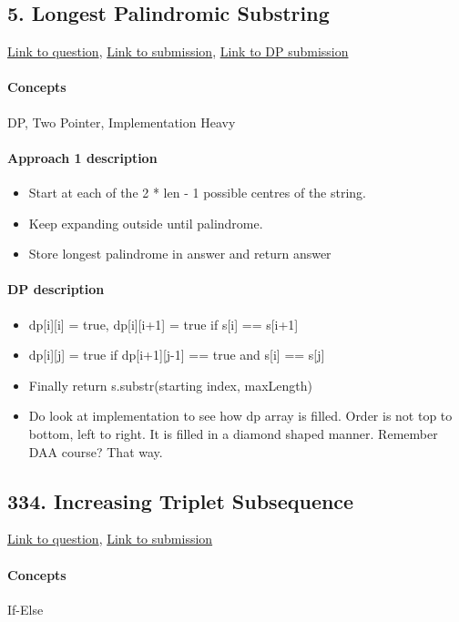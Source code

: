 \documentclass[11pt]{book}
\begin{document}
\subsection{5. Longest Palindromic Substring}
\href{https://leetcode.com/problems/longest-palindromic-substring/}{Link to question},
\href{https://leetcode.com/submissions/detail/337683777/}{Link to submission},
\href{https://leetcode.com/submissions/detail/337711978/}{Link to DP submission}
\paragraph{Concepts}
DP, Two Pointer, Implementation Heavy
\paragraph{Approach 1 description}
\begin{itemize}
    \item Start at each of the 2 * len - 1 possible centres of the string.
    \item Keep expanding outside until palindrome.
    \item Store longest palindrome in answer and return answer
\end{itemize}
\paragraph{DP description}
\begin{itemize}
    \item dp[i][i] = true, dp[i][i+1] = true if s[i] == s[i+1]
    \item dp[i][j] = true if dp[i+1][j-1] == true and s[i] == s[j]
    \item Finally return s.substr(starting index, maxLength)
    \item Do look at implementation to see how dp array is filled. Order is not top to bottom, left to right. It is filled in a diamond shaped manner. Remember DAA course? That way.
\end{itemize}

\subsection{334. Increasing Triplet Subsequence}
\href{https://leetcode.com/problems/increasing-triplet-subsequence/}{Link to question},
\href{https://leetcode.com/submissions/detail/328930482/}{Link to submission}
\paragraph{Concepts}
If-Else
\end{document}
